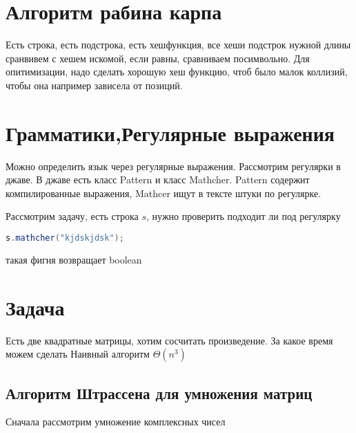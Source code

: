 \documentclass[14pt]{extarticle}
\begin{document}
    \section{Алгоритм рабина карпа}
    Есть строка, есть подстрока, есть хешфункция, все хеши подстрок нужной длины сранвивем с хешем искомой, если равны, сравниваем посимвольно. Для опитимизации, надо сделать хорошую хеш функцию, чтоб было малок коллизий, чтобы она например зависела от позиций.
    \section{Грамматики,Регулярные выражения}
    Можно определить язык через регулярные выражения. Рассмотрим регулярки в джаве. В джаве есть класс Pattern и класс Mathcher. Pattern содержит компилированные выражения, Mathcer ищут в тексте штуки по регулярке.

    Рассмотрим задачу, есть строка $s$, нужно проверить подходит ли под регулярку 
 \begin{lstlisting}[language=Java] 
 s.mathcher("kjdskjdsk");
\end{lstlisting} 
    такая фигня возвращает boolean
\section{Задача}
Есть две квадратные матрицы, хотим сосчитать произведение. За какое время можем сделать
Наивный алгоритм   $\Theta(n^{3})$
\subsection{Алгоритм Штрассена для умножения матриц}
Сначала рассмотрим умножение комплексных чисел
 
\end{document}
